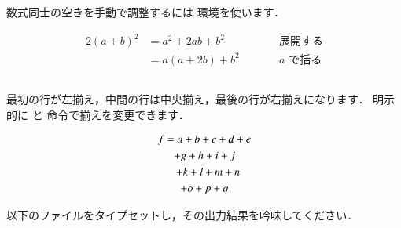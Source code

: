 数式同士の空きを手動で調整するには  環境を使います．
\begin{inout}
\begin{alignat*}{2}
(a+b)^2 &= a^2+2ab+b^2 &
   \qquad & \text{展開する}\\
        &=a(a+2b)+b^2  &
 & \text{$a$ で括る}
\end{alignat*}
\end{inout}


\subsection{}

最初の行が左揃え，中間の行は中央揃え，最後の行が右揃えになります．
明示的に  と  命令で揃えを変更できます．
\begin{inout}
\begin{multline}
 f = a + b + c + d + e \\
  + g + h + i + j \\
  \shoveright{+ k + l + m + n}\\
  + o + p + q  
\end{multline}
\end{inout}

以下のファイルをタイプセットし，その出力結果を吟味してください．

